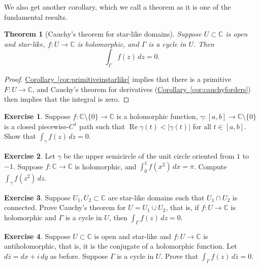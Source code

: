 \documentclass[12pt,openany]{book}
\renewcommand{\Re}{\operatorname{Re}}
\newcommand{\sabs}[1]{\lvert {#1} \rvert}
\newcommand{\C}{{\mathbb{C}}}
\theoremstyle{plain}
\newtheorem{thm}{Theorem}[section]
\theoremstyle{remark}
\theoremstyle{definition}
\newenvironment{exbox}{%
    \def\FrameCommand{\vrule width 1pt \relax\hspace{10pt}}%
    \MakeFramed{\advance\hsize-\width\FrameRestore}%
}{%
    \endMakeFramed
}
\theoremstyle{exercise}
\newtheorem{exercise}{Exercise}[section]
\theoremstyle{example}
\newcommand{\corref}[1]{\hyperref[#1]{Corollary~\ref*{#1}}}
\begin{document}
We also get another corollary, which we call
a theorem as it is one of the fundamental results.

\begin{thm}[Cauchy's theorem for star-like domains]
%
Suppose $U \subset \C$ is open and star-like, $f \colon U \to \C$ is holomorphic,
and $\Gamma$ is
a cycle
in $U$.  Then
\begin{equation*}
\int_{\Gamma} f(z) \, dz = 0 .
\end{equation*}
\end{thm}

\begin{proof}
\corref{cor:primitiveinstarlike} implies that there is
a primitive $F \colon U \to \C$, and
Cauchy's theorem for derivatives (\corref{cor:cauchyforders}) then implies that the integral is zero.
\end{proof}

\begin{exbox}
\begin{exercise}
Suppose $f \colon \C \setminus \{ 0 \} \to \C$ is a holomorphic function,
$\gamma \colon [a,b] \to \C \setminus \{ 0 \}$ is a closed piecewise-$C^1$ path
such that $\Re \gamma(t) < \sabs{\gamma(t)}$ for all $t \in [a,b]$.
Show that $\int_\gamma f(z) \, dz = 0$.
\end{exercise}

\begin{exercise}
Let $\gamma$ be the upper semicircle of the unit circle oriented from $1$ to
$-1$.   Suppose $f \colon \C \to \C$ is holomorphic, and $\int_0^1 f(x^2) \,
dx = \pi$.  Compute $\int_\gamma f(z^2) \, dz$.
\end{exercise}

\begin{exercise}
Suppose $U_1, U_2 \subset \C$ are star-like domains such that $U_1 \cap U_2$
is connected.  Prove Cauchy's theorem for $U = U_1 \cup U_2$, that is,
if $f \colon U \to \C$ is holomorphic and $\Gamma$ is a cycle in $U$,
then $\int_\Gamma f(z) \, dz = 0$.
\end{exercise}

\begin{exercise}
Suppose $U \subset \C$ is open and star-like and
$f \colon U \to \C$ is antiholomorphic, that is, it is the conjugate of a
holomorphic function.  Let $d\bar{z} = dx + i \, dy$ as before.  Suppose
$\Gamma$ is a cycle in $U$.  Prove that
$\int_\Gamma f(z) \, d\bar{z} = 0$.
\end{exercise}
\end{exbox}
\end{document}
